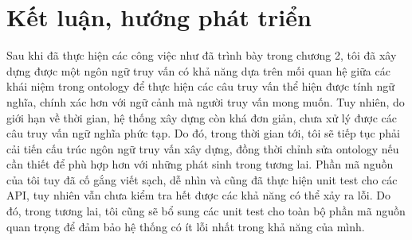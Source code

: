 \chapter{ Kết luận, hướng phát triển}

Sau khi đã thực hiện các công việc như đã trình bày trong chương 2, tôi đã xây dựng được một ngôn ngữ truy vấn có khả năng dựa trên mối quan hệ giữa các khái niệm trong ontology để thực hiện các câu truy vấn thể hiện được tính ngữ nghĩa, chính xác hơn với ngữ cảnh mà người truy vấn mong muốn. 
Tuy nhiên, do giới hạn về thời gian, hệ thống xây dựng còn khá đơn giản, chưa xử lý được các câu truy vấn ngữ nghĩa phức tạp. Do đó, trong thời gian tới, tôi sẽ tiếp tục phải cải tiến cấu trúc ngôn ngữ truy vấn xây dựng, đồng thời chỉnh sửa ontology nếu cần thiết để phù hợp hơn với những phát sinh trong tương lai. 
Phần mã nguồn của tôi tuy đã cố gắng viết sạch, dễ nhìn và cũng đã thực hiện unit test cho các API, tuy nhiên vẫn chưa kiểm tra hết được các khả năng có thể xảy ra lỗi. Do đó, trong tương lai, tôi cũng sẽ bổ sung các unit test cho toàn bộ phần mã nguồn quan trọng để đảm bảo hệ thống có ít lỗi nhất trong khả năng của mình.
